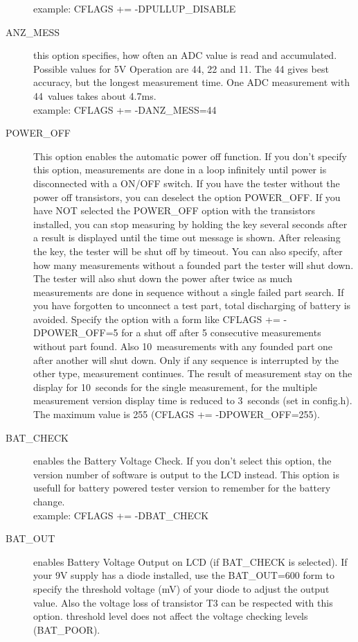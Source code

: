\begin{description}
example: CFLAGS += -DPULLUP\_DISABLE
  \item[ANZ\_MESS] this option specifies, how often an ADC value is read and accumulated.
Possible values for 5V Operation are 44, 22 and 11. The 44 gives best accuracy, but the longest measurement time.
One ADC measurement with 44~values takes about 4.7ms.\\
example: CFLAGS += -DANZ\_MESS=44
  \item[POWER\_OFF] This option enables the automatic power off function. If you don't specify this option,
 measurements are done in a loop infinitely  until power is disconnected with a ON/OFF switch.
If you have the tester without the power off transistors, you can deselect the option POWER\_OFF.
If you have NOT selected the POWER\_OFF option with the transistors installed,
you can stop measuring by holding the key several seconds after a result is displayed until the time out message is shown.
After releasing the key, the tester will be shut off by timeout.
You can also specify, after how many measurements without a founded part the tester will shut down.
The tester will also shut down the power after twice as much measurements are done in sequence without a
single failed part search. If you have forgotten to unconnect a test part, total discharging of battery is avoided. 
Specify the option with a form like CFLAGS += -DPOWER\_OFF=5 for a shut off after 5 consecutive measurements
without part found. Also 10~measurements with any founded part one after another will shut down.
Only if any sequence is interrupted by the other type, measurement continues.
The result of measurement stay on the display for 10~seconds for the single measurement, for the
multiple measurement version display time is reduced to 3~seconds (set in config.h).
The maximum value is 255 (CFLAGS += -DPOWER\_OFF=255).
  \item[BAT\_CHECK] enables the Battery Voltage Check. If you don't select this option, the version number of
software is output to the LCD instead.
This option is usefull for battery powered tester version to remember for the battery change.\\
example: CFLAGS += -DBAT\_CHECK
  \item[BAT\_OUT] enables Battery Voltage Output on LCD (if BAT\_CHECK is selected).
 If your 9V supply has a diode installed, use the BAT\_OUT=600 form to specify the threshold voltage (mV) of your diode
to adjust the output value.
Also the voltage loss of transistor T3 can be respected with this option.
 threshold level does not affect the voltage checking levels (BAT\_POOR).\\

\end{description}

